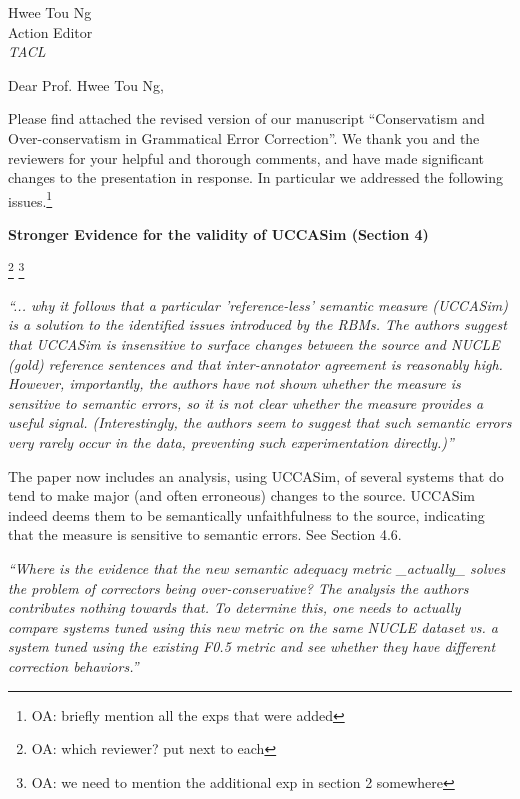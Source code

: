 \documentclass[11pt,letterpaper]{letter}
\newcommand{\oa}[1]{\footnote{\color{red}OA: #1}}
\begin{document}
\begin{letter}{%
Hwee Tou Ng\\
Action Editor\\
{\em TACL}\\
}



\vspace{.5cm}

  \opening{Dear Prof. Hwee Tou Ng,}


\vspace{.5cm}
  
  Please find attached the revised version of our manuscript ``Conservatism and Over-conservatism in Grammatical Error Correction''. We thank you and the reviewers for your helpful and thorough comments, and have made significant changes to the presentation in response. In particular we addressed the following issues.\oa{briefly mention all the exps that were added}

\vspace{.5cm}

{\large\bf Stronger Evidence for the validity of UCCASim (Section 4)}

\oa{which reviewer? put next to each}
\oa{we need to mention the additional exp in section 2 somewhere}

\emph{``... why it follows that a
	particular 'reference-less' semantic measure (UCCASim) is a solution to the
	identified issues introduced by the RBMs. The authors suggest that UCCASim
	is insensitive to surface changes between the source and NUCLE (gold)
	reference sentences and that inter-annotator agreement is reasonably high.
	However, importantly, the authors have not shown whether the measure is
	sensitive to semantic errors, so it is not clear whether the measure
	provides a useful signal. (Interestingly, the authors seem to suggest that
	such semantic errors very rarely occur in the data, preventing such
	experimentation directly.)''
}

The paper now includes an analysis, using UCCASim, of several systems that do tend to
make major (and often erroneous) changes to the source. UCCASim indeed deems them to be semantically
unfaithfulness to the source, indicating that the measure is sensitive to semantic errors. See Section 4.6.

\emph{``Where is the evidence that the new semantic adequacy metric \_actually\_
	solves the problem of correctors being over-conservative? The analysis the
	authors contributes nothing towards that. To determine this, one needs to
	actually compare systems tuned using this new metric on the same NUCLE
	dataset vs. a system tuned using the existing F0.5 metric and see whether
	they have different correction behaviors.''
	}


\end{letter}
\end{document}
